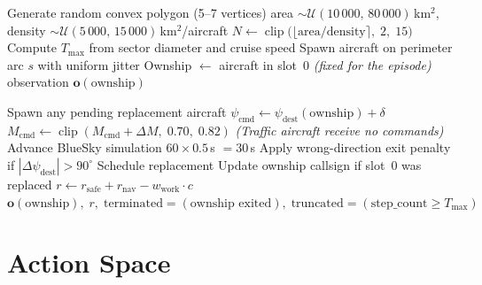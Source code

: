 \documentclass[11pt, a4paper]{article}
\begin{document}
\begin{algorithm}[h]
\caption{\textsc{Reset} — initialise a new episode}
\label{alg:reset}
\begin{algorithmic}[1]
\State Generate random convex polygon (5--7 vertices)
\State area $\sim\mathcal{U}(10\,000,\,80\,000)$\,km$^2$,\quad
       density $\sim\mathcal{U}(5\,000,\,15\,000)$\,km$^2$/aircraft
\State $N \leftarrow \operatorname{clip}\!\bigl(\lfloor\text{area}/\text{density}\rceil,\;2,\;15\bigr)$
\State Compute $T_\text{max}$ from sector diameter and cruise speed
    \State Spawn aircraft on perimeter arc $s$ with uniform jitter
\EndFor
\State Ownship $\leftarrow$ aircraft in slot~0 \quad\textit{(fixed for the episode)}
\State \Return observation $\mathbf{o}(\text{ownship})$
\end{algorithmic}
\end{algorithm}

\begin{algorithm}[h]
\caption{\textsc{Step}(action) — advance one RL step (30\,s simulated)}
\label{alg:step}
\begin{algorithmic}[1]
\State Spawn any pending replacement aircraft
    \State $\psi_\text{cmd} \leftarrow \psi_\text{dest}(\text{ownship}) + \delta$
    \State $M_\text{cmd} \leftarrow \operatorname{clip}(M_\text{cmd} + \Delta M,\;0.70,\;0.82)$
\EndIf
\State \textit{(Traffic aircraft receive no commands)}
\State Advance BlueSky simulation $60\times0.5$\,s $= 30$\,s
        \State Apply wrong-direction exit penalty if $|\Delta\psi_\text{dest}| > 90^\circ$
    \EndIf
    \State Schedule replacement
\EndFor
\State Update ownship callsign if slot~0 was replaced
\State $r \leftarrow r_\text{safe} + r_\text{nav} - w_\text{work}\cdot c$
\State \Return $\mathbf{o}(\text{ownship}),\; r,\;
               \text{terminated}=(\text{ownship exited}),\;
               \text{truncated}=(\text{step\_count} \geq T_\text{max})$
\end{algorithmic}
\end{algorithm}

\section{Action Space}
\end{document}
